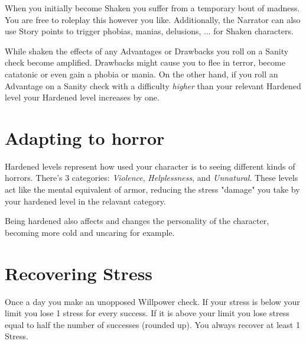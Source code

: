 When you initially become Shaken you suffer from a temporary bout of madness. 
You are free to roleplay this however you like. 
Additionally, the Narrator can also use Story points to trigger 
phobias, manias, delusions, ... for Shaken characters.


While shaken the effects of any Advantages or Drawbacks you roll on a Sanity check become amplified.
Drawbacks might cause you to flee in terror, become catatonic or even gain a phobia or mania.
On the other hand, if you roll an Advantage on a Sanity check with a difficulty \textit{higher}
than your relevant Hardened level your Hardened level increases by one.




\section{Adapting to horror}

Hardened levels represent how used your character is to seeing different kinds of horrors.
There's 3 categories: \textit{Violence}, \textit{Helplessness}, and \textit{Unnatural}.
These levels act like the mental equivalent of armor, reducing the stress "damage" 
you take by your hardened level in the relavant category.

Being hardened also affects and changes the personality of the character, becoming more cold and uncaring for example.


\section{Recovering Stress}
Once a day you make an unopposed Willpower check. 
If your stress is below your limit you lose 1 stress for every success. 
If it is above your limit you lose stress equal to half the number of successes (rounded up).
You always recover at least 1 Stress.

